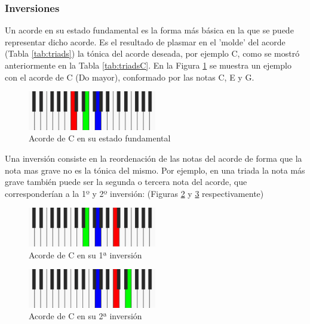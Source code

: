 \subsubsection{Inversiones}\label{subsec:inversiones}


Un acorde en su estado fundamental es la forma más básica en la que se puede representar dicho acorde. Es el resultado de plasmar en el 'molde' del acorde (Tabla \ref{tab:triads}) la tónica del acorde deseada, por ejemplo C, como se mostró anteriormente en la Tabla \ref{tab:triadsC}. En la Figura \ref{fig:fundamental} se muestra un ejemplo con el acorde de C (Do mayor), conformado por las notas \textcolor{rojo}{C}, \textcolor{verde}{E} y \textcolor{azul}{G}.

\begin{figure}[h]
    \centering
    \includegraphics[width = 0.5\textwidth]{Imagenes/Bitmap/fundamental.png}
    \caption{Acorde de C en su estado fundamental}
    \label{fig:fundamental}
\end{figure}

Una inversión consiste en la reordenación de las notas del acorde de forma que la nota mas grave no es la tónica del mismo. Por ejemplo, en una triada la nota más grave también puede ser la segunda o tercera nota del acorde, que corresponderían a la 1º y 2º inversión: (Figuras \ref{fig:inversion1} y \ref{fig:inversion2} respectivamente)

\begin{figure}[h]
    \centering
    \includegraphics[width = 0.5\textwidth]{Imagenes/Bitmap/1era_inversion.png}
    \caption{Acorde de C en su 1ª inversión}
    \label{fig:inversion1}
\end{figure}

\begin{figure}[h]
    \centering
    \includegraphics[width = 0.5\textwidth]{Imagenes/Bitmap/2da_inversion.png}
    \caption{Acorde de C en su 2ª inversión}
    \label{fig:inversion2}
\end{figure}

